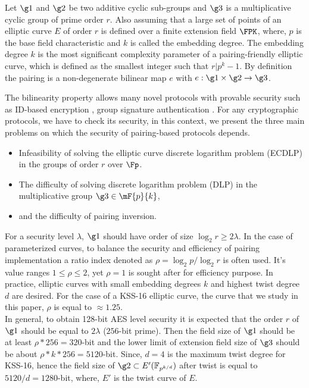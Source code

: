 Let $\g1$ and $\g2$ be two additive cyclic sub-groups and $\g3$ is a multiplicative cyclic group of prime order $r$.
Also assuming that a large set of points of an elliptic curve $E$ of order $r$ is defined over a finite extension field $\FPK$, where, $p$ is the base field characteristic and $k$ is called the embedding degree.
 The embedding degree $k$ is the most significant complexity parameter of a pairing-friendly elliptic curve, which is defined as the smallest integer such that $r|p^k-1$. 
By definition the pairing is a non-degenerate bilinear map  $e$ with $e: \g1 \times \g2 \to \g3 $.

The bilinearity property allows many novel protocols with provable security such as  ID-based encryption \cite{short_sign},  group signature authentication \cite{group_sign_1}.
For any cryptographic protocols, we have to check its security, in this context, we present the three main problems on which the security of pairing-based protocols depends.
\begin{itemize}
	\item  Infeasibility of solving the elliptic curve discrete logarithm problem (ECDLP) in the groups of order $r$ over $\Fp$.
	\item The  difficulty of solving discrete logarithm problem (DLP) in the multiplicative group $\g3 \in \mF{p}{k}$,
	\item and the difficulty of pairing inversion.
\end{itemize}
For a security level $\lambda$, $\g1$ should have order of size $\log_2 r \geq 2\lambda$.  
In the case of parameterized curves, to balance the security and efficiency of pairing implementation a ratio index denoted as $\rho = \log_2 p/ \log_2 r$ is often used.
It's value ranges $1\leq  \rho  \leq 2$, yet $\rho=1$ is sought after for efficiency purpose. 
In practice, elliptic curves with small embedding degrees $k$ and highest twist degree $d$ are desired.
For the case of a KSS-16 elliptic curve, the curve that we study in this paper, $\rho$ is equal to  $ \approx 1.25$. \\
In general, to obtain 128-bit AES level security it is expected that the order $r$ of $\g1$ should be equal to $2\lambda $ ($256$-bit prime).
Then the field size  of  $\g1$ should be at least $\rho*256 = 320$-bit and the lower limit of extension field size of $\g3$ should be about $\rho*k*256= 5120$-bit.
Since,  $d=4$ is the maximum twist degree for KSS-16, hence the field size of $\g2 \subset E'(\mathbb{F}_{p^{k/d}})$ after twist is  equal to $5120/d=1280$-bit, where, $E'$ is the twist curve of $E$.

